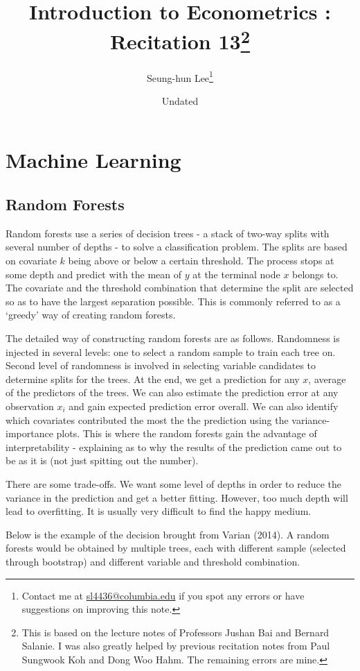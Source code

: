 \documentclass[12pt]{article}
\title{Introduction to Econometrics \ROM{2}: Recitation 13\footnote{This is based on the lecture notes of Professors Jushan Bai and Bernard Salanie. I was also greatly helped by previous recitation notes from Paul Sungwook Koh and Dong Woo Hahm. The remaining errors are mine. }}
\theoremstyle{definition}
\theoremstyle{property}
\theoremstyle{assumption}
\theoremstyle{example}
\theoremstyle{comment}
\begin{document}
\linespread{1.25}
\onehalfspacing

\author{Seung-hun Lee\footnote{Contact me at \href{mailto:sl4436@columbia.edu}{sl4436@columbia.edu} if you spot any errors or have suggestions on improving this note.}}
\date{Undated}
\maketitle
\thispagestyle{firstpage}

\section{Machine Learning}
\subsection{Random Forests}
Random forests use a series of decision trees - a stack of two-way splits with several number of depths - to solve a classification problem. The splits are based on covariate $k$ being above or below a certain threshold. The process stops at some depth and predict with the mean of $y$ at the terminal node $x$ belongs to. The covariate and the threshold combination that determine the split are selected so as to have the largest separation possible. This is commonly referred to as a `greedy' way of creating random forests.  \par
The detailed way of constructing random forests are as follows. Randomness is injected in several levels: one to select a random sample to train each tree on. Second level of randomness is involved in selecting variable candidates to determine splits for the trees. At the end, we get a prediction for any $x$, average of the predictors of the trees. We can also estimate the prediction error at any observation $x_i$ and gain expected prediction error overall. We can also identify which covariates contributed the most the the prediction using the variance-importance plots. This is where the random forests gain the advantage of interpretability - explaining as to why the results of the prediction came out to be as it is (not just spitting out the number). \par
There are some trade-offs. We want some level of depths in order to reduce the variance in the prediction and get a better fitting. However, too much depth will lead to overfitting. It is usually very difficult to find the happy medium. \par
Below is the example of the decision brought from Varian (2014). A random forests would be obtained by multiple trees, each with different sample (selected through bootstrap) and different variable and threshold combination. 
\end{document}
